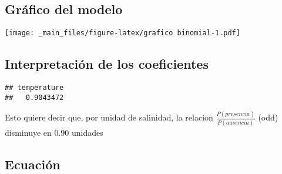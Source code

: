 \documentclass[
]{book}
\newenvironment{Shaded}{\begin{snugshade}}{\end{snugshade}}
\newcommand{\CommentTok}[1]{\textcolor[rgb]{0.56,0.35,0.01}{\textit{#1}}}
\newcommand{\DataTypeTok}[1]{\textcolor[rgb]{0.13,0.29,0.53}{#1}}
\newcommand{\DecValTok}[1]{\textcolor[rgb]{0.00,0.00,0.81}{#1}}
\newcommand{\KeywordTok}[1]{\textcolor[rgb]{0.13,0.29,0.53}{\textbf{#1}}}
\newcommand{\NormalTok}[1]{#1}
\newcommand{\OperatorTok}[1]{\textcolor[rgb]{0.81,0.36,0.00}{\textbf{#1}}}
\newcommand{\StringTok}[1]{\textcolor[rgb]{0.31,0.60,0.02}{#1}}
\begin{document}
\hypertarget{gruxe1fico-del-modelo}{%
\subsection{Gráfico del modelo}\label{gruxe1fico-del-modelo}}

\begin{Shaded}
\end{Shaded}

\texttt{[image: \_main\_files/figure-latex/grafico binomial-1.pdf]}

\hypertarget{interpretaciuxf3n-de-los-coeficientes}{%
\subsection{Interpretación de los coeficientes}\label{interpretaciuxf3n-de-los-coeficientes}}

\begin{Shaded}
\end{Shaded}

\begin{verbatim}
## temperature 
##   0.9043472
\end{verbatim}

Esto quiere decir que, por unidad de salinidad, la relacion \(\frac{P(presencia)}{P(ausencia)}\) (odd) disminuye en 0.90 unidades

\hypertarget{ecuaciuxf3n}{%
\subsection{Ecuación}\label{ecuaciuxf3n}}
\end{document}
